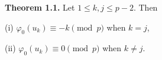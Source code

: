 \textbf{Theorem 1.1.} Let $1 \leq k, j \leq p-2$. Then

(i) $\varphi_0(u_k) \equiv -k \pmod{p}$ when $k = j$,

(ii) $\varphi_0(u_k) \equiv 0 \pmod{p}$ when $k \neq j$.
